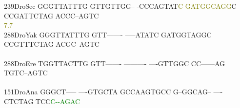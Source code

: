 \documentclass[11pt,twoside,reqno,a4paper]{article}
\begin{document}
{239\hspace*{1\charwidth}DroSec	GGGTTATTTG	GTTGTTGG--	-CCCAGTAT\textcolor{olive}{C}	\textcolor{olive}{G}\textcolor{olive}{A}\textcolor{olive}{T}\textcolor{olive}{G}\textcolor{olive}{G}\textcolor{olive}{C}\textcolor{olive}{A}\textcolor{olive}{G}\textcolor{olive}{G}C	CCGATTCTAG	ACCC--AGTC	\\
\hspace*{4\charwidth}\hspace*{7\charwidth}\hspace*{1\charwidth}\hspace*{1\charwidth}\hspace*{29\charwidth}\textcolor{olive}{7.7}\hspace*{1\charwidth}\hspace*{1\charwidth}\hspace*{1\charwidth}\hspace*{1\charwidth}\\
288\hspace*{1\charwidth}DroYak	GGGTTATTTG	GTT-------	-----ATATC	GATGGTAGGC	CCGTTTCTAG	ACGC--AGTC	\\
\hspace*{4\charwidth}\hspace*{7\charwidth}\hspace*{1\charwidth}\hspace*{1\charwidth}\hspace*{1\charwidth}\hspace*{1\charwidth}\hspace*{1\charwidth}\hspace*{1\charwidth}\\
288\hspace*{1\charwidth}DroEre	TGGTTACTTG	GTT-------	----------	----GTTGGC	CC------AG	TGTC--AGTC	\\
\hspace*{4\charwidth}\hspace*{7\charwidth}\hspace*{1\charwidth}\hspace*{1\charwidth}\hspace*{1\charwidth}\hspace*{1\charwidth}\hspace*{1\charwidth}\hspace*{1\charwidth}\\
151\hspace*{1\charwidth}DroAna	GGGCT-----	----GTGCTA	GCCAAGTGCC	G--GGCAG--	----CTCTAG	TCC\textcolor{green}{C}\textcolor{green}{-}\textcolor{green}{-}\textcolor{green}{A}\textcolor{green}{G}\textcolor{green}{A}\textcolor{green}{C}	\\
}
\end{document}
